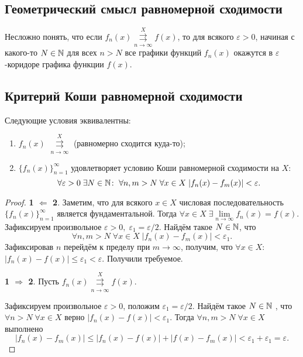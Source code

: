 \documentclass[a4paper, 12pt]{article}
\begin{document}
	\subsection{Геометрический смысл равномерной сходимости}
	Несложно понять, что если $f_n(x) \overset{X}{\underset{n\to\infty}{\rightrightarrows}} f(x)$, то для всякого $\varepsilon > 0$, начиная с какого-то $N\in \mathbb{N}$ для всех $n>N$ все графики функций $f_n(x)$ окажутся в $\varepsilon$-коридоре графика функции $f(x)$.
	\subsection{Критерий Коши равномерной сходимости}
	\begin{Theorem}
		Следующие условия эквивалентны:
		\begin{enumerate}
			\item $f_n(x)$ $\overset{X}{\underset{n\to\infty}{\rightrightarrows}}$ (равномерно сходится куда-то);
			\item $\{f_n(x)\}_{n=1}^\infty$ удовлетворяет условию Коши равномерной сходимости на $X$:
			$$
			\forall \varepsilon > 0\; \exists N\in\mathbb{N}\colon \; \forall n,m>N\; \forall x\in X\; |f_n(x) - f_m(x)| < \varepsilon.
			$$
		\end{enumerate}
	\end{Theorem}
	\begin{proof}
		\par \textbf{1 $\Leftarrow$ 2}. Заметим, что для всякого $x\in X$ числовая последовательность $\{f_n(x)\}_{n=1}^\infty$ является фундаментальной. Тогда $\forall x\in X\; \exists \lim\limits_{n\to \infty} f_n(x) = f(x)$. Зафиксируем произвольное $\varepsilon > 0,\; \varepsilon_1 = \varepsilon / 2$. Найдём такое $N \in \mathbb{N}$, что 
		$$
			\forall n,m>N\; \forall x\in X\; |f_n(x) - f_m(x)| < \varepsilon_1.
		$$
		Зафиксировав $n$ перейдём к пределу при $m \to \infty$, получим, что $\forall x \in X:$ $|f_n(x) - f(x)| \leqslant \varepsilon_1 < \varepsilon$. Получили требуемое.
		\par \textbf{1 $\Rightarrow$ 2}. Пусть $f_n(x) \overset{X}{\underset{n\to\infty}{\rightrightarrows}} f(x)$.
		\par Зафиксируем произвольное $\varepsilon > 0$, положим $\varepsilon_1 = \varepsilon / 2$. Найдём такое $N\in \mathbb{N}$ , что $\forall n>N\; \forall x\in X$ верно $ |f_n(x) - f(x)| < \varepsilon_1$. Тогда $\forall n,m > N\; \forall x \in X$ выполнено
		$$
			|f_n(x) - f_m(x)| \leqslant |f_n(x) - f(x)| + |f(x) - f_m(x)| < \varepsilon_1 + \varepsilon_1 = \varepsilon.
		$$
	\end{proof}
\end{document}
